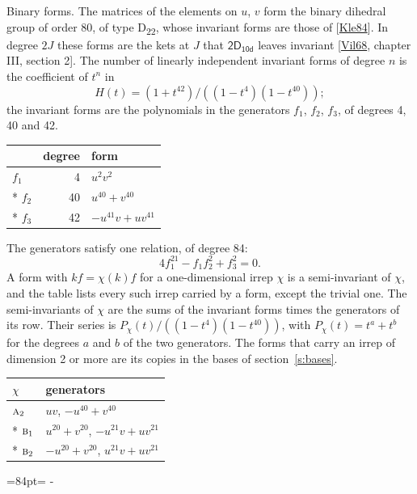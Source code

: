 \documentclass[10pt,a4paper]{article}
\makeatletter
\renewcommand\paragraph{\@startsection{paragraph}{4}{\z@}{1.5ex plus .5ex minus .2ex}{-1em}%
  {\normalfont\small\sffamily\bfseries\color{parttitle}}}
\newcommand{\needspace}[1]{\par\penalty-100\begingroup\dimen0=#1\relax\dimen2=\pagegoal
  \advance\dimen2-\pagetotal\ifdim\dimen0>\dimen2\relax\ifdim\dimen2>0pt\vfil\break\fi\fi
  \endgroup}
\numberwithin{equation}{section}
\newcommand{\grp}[1]{\mathsf{#1}}
\newcommand{\irr}[1]{\text{\normalfont\scshape #1}}
\makeatother
\begin{document}
\paragraph{Binary forms.}
The matrices of the elements on $u$, $v$ form the binary dihedral group of order 80, of type D\textsubscript{22}, whose invariant forms are those of [\href{../../../REFERENCES.pdf\#ref.Kle84}{Kle84}]. In degree $2J$ these forms are the kets at $J$ that $\grp{2D_{10d}}$ leaves invariant [\href{../../../REFERENCES.pdf\#ref.Vil68}{Vil68}, chapter III, section 2]. \label{n:head.degree}\label{n:head.form}The number of linearly independent invariant forms of degree $n$ is the coefficient of $t^n$ in
\begin{equation}\label{e:molien}H(t) = (1 + t^{42})/((1-t^{4})(1-t^{40}));\end{equation}
the invariant forms are the polynomials in the generators $f_1$, $f_2$, $f_3$, of degrees 4, 40 and 42.
{\small\begin{longtable}{@{}lrl@{}}\toprule
& degree & form\\\midrule\endhead
\bottomrule\endfoot\endlastfoot
$f_{1}$ & 4 & $u^{2}v^{2}$\\*
$f_{2}$ & 40 & $u^{40} + v^{40}$\\*
$f_{3}$ & 42 & $-u^{41}v + uv^{41}$\\
\bottomrule\end{longtable}}
The generators satisfy one relation, of degree 84:
\begin{equation}\label{e:relation}4f_{1}^{21} - f_{1}f_{2}^{2} + f_{3}^{2} = 0.\end{equation}
A form with $k f = \chi(k) f$ for a one-dimensional irrep $\chi$ is a semi-invariant of $\chi$, and the table lists every such irrep carried by a form, except the trivial one. \label{n:head.generators}The semi-invariants of $\chi$ are the sums of the invariant forms times the generators of its row. Their series is $P_\chi(t)/((1-t^{4})(1-t^{40}))$, with $P_\chi(t) = t^{a} + t^{b}$ for the degrees $a$ and $b$ of the two generators. The forms that carry an irrep of dimension 2 or more are its copies in the bases of section~\ref{s:bases}.
{\small\begin{longtable}{@{}ll@{}}\toprule
$\chi$ & generators\\\midrule\endhead
\bottomrule\endfoot\endlastfoot
$\irr{a}_{2}$ & $uv$, $-u^{40} + v^{40}$\\*
$\irr{b}_{1}$ & $u^{20} + v^{20}$, $-u^{21}v + uv^{21}$\\*
$\irr{b}_{2}$ & $-u^{20} + v^{20}$, $u^{21}v + uv^{21}$\\
\bottomrule\end{longtable}}
\needspace{84pt}
\end{document}

